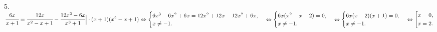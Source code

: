 5. $\cfrac{6x}{x+1}=\cfrac{12x}{x^2-x+1}-\cfrac{12x^2-6x}{x^3+1}\Big|\cdot (x+1)(x^2-x+1)\Leftrightarrow
\begin{cases}
6x^3-6x^2+6x=12x^2+12x-12x^2+6x,\\
x\neq-1.\end{cases}\Leftrightarrow
\begin{cases}
6x(x^2-x-2)=0,\\
x\neq-1.\end{cases}\Leftrightarrow
\begin{cases}
6x(x-2)(x+1)=0,\\
x\neq-1.\end{cases}\Leftrightarrow
\left[
\begin{gathered}
x=0, \hfill
\\
x=2. \hfill
\\
\end{gathered}
\right.\hfill$\\
